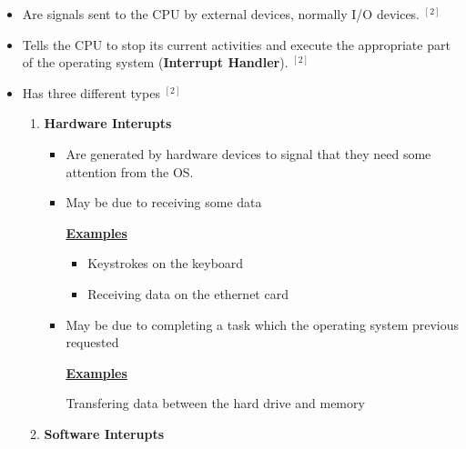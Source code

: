 \documentclass[12pt]{article}
\begin{document}
\begin{enumerate}[1.]
\begin{itemize}
        \begin{itemize}
            \item Are signals sent to the CPU by external devices, normally I/O devices. $^{[2]}$
            \item Tells the CPU to stop its current activities and execute the appropriate part of the operating system (\textbf{Interrupt Handler}). $^{[2]}$
            \item Has three different types $^{[2]}$

            \begin{enumerate}[1)]
                \item \textbf{Hardware Interupts}

                \begin{itemize}
                    \item Are generated by hardware devices to signal that they need some attention from the OS.
                    \item May be due to receiving some data

                    \bigskip

                    \underline{\textbf{Examples}}

                    \bigskip

                    \begin{itemize}
                        \item Keystrokes on the keyboard
                        \item Receiving data on the ethernet card
                    \end{itemize}

                    \bigskip

                    \item May be due to completing a task which the operating system previous requested

                    \bigskip

                    \underline{\textbf{Examples}}

                    \bigskip

                    Transfering data between the hard drive and memory
                \end{itemize}

                \bigskip

                \item \textbf{Software Interupts}

                \bigskip


\end{enumerate}
\end{itemize}
\end{itemize}
\end{enumerate}
\end{document}
